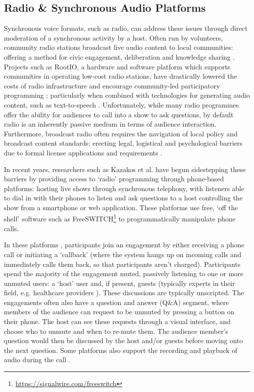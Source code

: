 \subsection{Radio \& Synchronous Audio Platforms}
\label{section:talkshow}

Synchronous voice formats, such as radio, can address these issues through direct moderation of a synchronous activity by a host. Often run by volunteers, community radio stations broadcast live audio content to local communities: offering a method for civic engagement, deliberation and knowledge sharing \cite{Cibin2019, Maye2020}. Projects such as RootIO, a hardware and software platform which supports communities in operating low-cost radio stations, have drastically lowered the costs of radio infrastructure and encourage community-led participatory programming \cite{Csik2016}: particularly when combined with technologies for generating audio content, such as text-to-speech \cite{Scott2020}. Unfortunately, while many radio programmes offer the ability for audiences to call into a show to ask questions, by default radio is an inherently passive medium in terms of audience interaction. Furthermore, broadcast radio often requires the navigation of local policy and broadcast content standards: erecting legal, logistical and psychological barriers due to formal license applications and requirements \cite{Maye2020, Bidwell2021}.

In recent years, researchers such as Kazakos et al. \cite{Kazakos2016} have begun sidestepping these barriers by providing access to `radio' programming through phone-based platforms: hosting live shows through synchronous telephony, with listeners able to dial in with their phones to listen and ask questions to a host controlling the show from a smartphone or web application. These platforms use free, `off the shelf' software such as FreeSWITCH\footnote{\url{https://signalwire.com/freeswitch}} to programmatically manipulate phone calls. 

In these platforms \cite{Kazakos2016, Talhouk2017, Yadav2017}, participants join an engagement by either receiving a phone call or initiating a `callback' (where the system hangs up on incoming calls and immediately calls them back, so that participants aren't charged). Participants spend the majority of the engagement muted, passively listening to one or more unmuted users: a `host' user and, if present, guests (typically experts in their field, e.g. healthcare providers \cite{Talhouk2017}). These discussions are typically unscripted. The engagements often also have a question and answer (Q\&A) segment, where members of the audience can request to be unmuted by pressing a button on their phone. The host can see these requests through a visual interface, and choose who to unmute and when to re-mute them. The audience member's question would then be discussed by the host and/or guests before moving onto the next question. Some platforms also support the recording and playback of audio during the call \cite{Talhouk2017, Yadav2017}.

